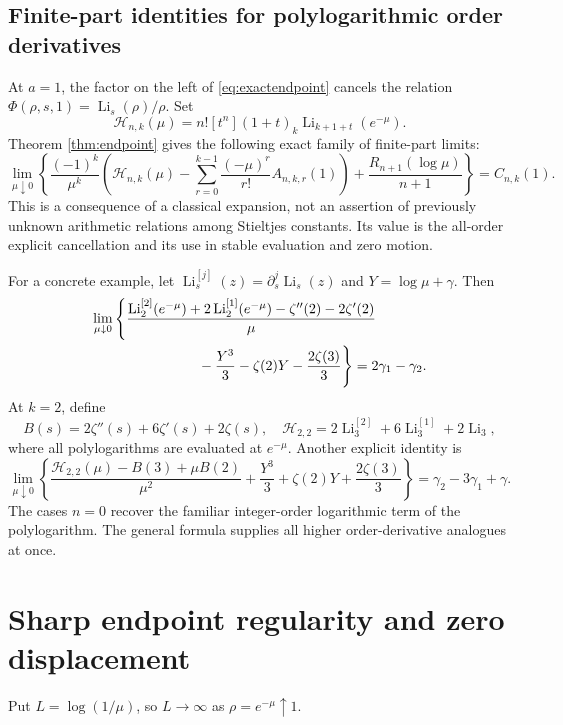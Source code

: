 \documentclass[11pt]{article}
\numberwithin{equation}{section}
\theoremstyle{definition}\newtheorem{definition}[theorem]{Definition}
\theoremstyle{remark}\newtheorem{remark}[theorem]{Remark}
\DeclareMathOperator{\Li}{Li}
\begin{document}
\subsection{Finite-part identities for polylogarithmic order derivatives}
At $a=1$, the factor on the left of \eqref{eq:exactendpoint} cancels the relation $\Phi(\rho,s,1)=\Li_s(\rho)/\rho$. Set
\begin{equation}\label{eq:Hpoly}
\mathcal H_{n,k}(\mu)=n![t^n](1+t)_k\Li_{k+1+t}(e^{-\mu}).
\end{equation}
Theorem \ref{thm:endpoint} gives the following exact family of finite-part limits:
\begin{equation}\label{eq:finitepart}
\boxed{\lim_{\mu\downarrow0}\left\{
\frac{(-1)^k}{\mu^k}\left(\mathcal H_{n,k}(\mu)-\sum_{r=0}^{k-1}\frac{(-\mu)^r}{r!}A_{n,k,r}(1)\right)
+\frac{R_{n+1}(\log\mu)}{n+1}\right\}=C_{n,k}(1).}
\end{equation}
This is a consequence of a classical expansion, not an assertion of previously unknown arithmetic relations among Stieltjes constants. Its value is the all-order explicit cancellation and its use in stable evaluation and zero motion.

For a concrete example, let $\Li_s^{[j]}(z)=\partial_s^j\Li_s(z)$ and $Y=\log\mu+\gamma$. Then
\begin{align}\label{eq:Li2identity}
\lim_{\mu\downarrow0}\Bigg\{&
\frac{\Li_2^{[2]}(e^{-\mu})+2\Li_2^{[1]}(e^{-\mu})-\zeta''(2)-2\zeta'(2)}{\mu}\notag\\
&\hspace{18mm}-\frac{Y^3}{3}-\zeta(2)Y-\frac{2\zeta(3)}3\Bigg\}
=2\gamma_1-\gamma_2.
\end{align}
At $k=2$, define
\[
B(s)=2\zeta''(s)+6\zeta'(s)+2\zeta(s),\quad
\mathcal H_{2,2}=2\Li_3^{[2]}+6\Li_3^{[1]}+2\Li_3,
\]
where all polylogarithms are evaluated at $e^{-\mu}$. Another explicit identity is
\begin{equation}\label{eq:Li3identity}
\lim_{\mu\downarrow0}\left\{
\frac{\mathcal H_{2,2}(\mu)-B(3)+\mu B(2)}{\mu^2}
+\frac{Y^3}{3}+\zeta(2)Y+\frac{2\zeta(3)}3\right\}
=\gamma_2-3\gamma_1+\gamma.
\end{equation}
The cases $n=0$ recover the familiar integer-order logarithmic term of the polylogarithm. The general formula supplies all higher order-derivative analogues at once.

\section{Sharp endpoint regularity and zero displacement}\label{sec:regularity}
Put $L=\log(1/\mu)$, so $L\to\infty$ as $\rho=e^{-\mu}\uparrow1$.
\end{document}
